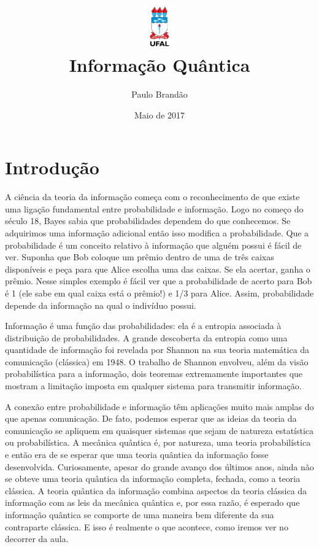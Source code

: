 \documentclass{article}
\title{\includegraphics[width=0.1\textwidth]{ufallogo.png} \\
\Huge{\color{astral}\textbf{Informação Quântica}}}
\author{Paulo Brandão}
\date{Maio de 2017}
\begin{document}
\maketitle

\section{Introdução}

A ciência da teoria da informação começa com o reconhecimento de que existe uma ligação fundamental entre probabilidade e informação. Logo no começo do século 18, Bayes sabia que probabilidades dependem do que conhecemos. Se adquirimos uma informação adicional então isso modifica a probabilidade. Que a probabilidade é um conceito relativo à informação que alguém possui é fácil de ver. Suponha que Bob coloque um prêmio dentro de uma de três caixas disponíveis e peça para que Alice escolha uma das caixas. Se ela acertar, ganha o prêmio. Nesse simples exemplo é fácil ver que a probabilidade de acerto para Bob é 1 (ele sabe em qual caixa está o prêmio!) e 1/3 para Alice. Assim, probabilidade depende da informação na qual o indivíduo possui.

Informação é uma função das probabilidades: ela é a entropia associada à distribuição de probabilidades. A grande descoberta da entropia como uma quantidade de informação foi revelada por Shannon na sua teoria matemática da comunicação (clássica) em 1948. O trabalho de Shannon envolveu, além da visão probabilística para a informação, dois teoremas extremamente importantes que mostram a limitação imposta em qualquer sistema para transmitir informação.

A conexão entre probabilidade e informação têm aplicações muito mais amplas do que apenas comunicação. De fato, podemos esperar que as ideias da teoria da comunicação se apliquem em quaisquer sistemas que sejam de natureza estatística ou probabilística. A mecânica quântica é, por natureza, uma teoria probabilística e então era de se esperar que uma teoria quântica da informação fosse desenvolvida. Curiosamente, apesar do grande avanço dos últimos anos, ainda não se obteve uma teoria quântica da informação completa, fechada, como a teoria clássica. A teoria quântica da informação combina aspectos da teoria clássica da informação com as leis da mecânica quântica e, por essa razão, é esperado que informação quântica se comporte de uma maneira bem diferente da sua contraparte clássica. E isso é realmente o que acontece, como iremos ver no decorrer da aula.
\end{document}
